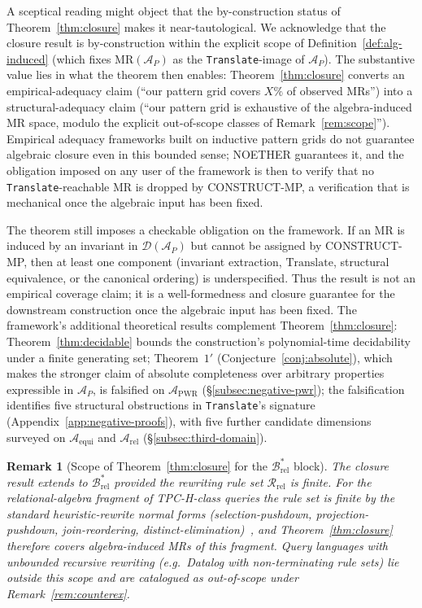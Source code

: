 \documentclass[acmsmall, screen]{acmart}
\newtheorem{remark}{Remark}
\begin{document}
A sceptical reading might object that the by-construction status of Theorem~\ref{thm:closure} makes it near-tautological. We acknowledge that the closure result is by-construction within the explicit scope of Definition~\ref{def:alg-induced} (which fixes $\mathrm{MR}(\mathcal{A}_P)$ as the \texttt{Translate}-image of $\mathcal{A}_P$). The substantive value lies in what the theorem then enables: Theorem~\ref{thm:closure} converts an empirical-adequacy claim (``our pattern grid covers $X\%$ of observed MRs'') into a structural-adequacy claim (``our pattern grid is exhaustive of the algebra-induced MR space, modulo the explicit out-of-scope classes of Remark~\ref{rem:scope}''). Empirical adequacy frameworks built on inductive pattern grids do not guarantee algebraic closure even in this bounded sense; NOETHER guarantees it, and the obligation imposed on any user of the framework is then to verify that no \texttt{Translate}-reachable MR is dropped by CONSTRUCT-MP, a verification that is mechanical once the algebraic input has been fixed.

The theorem still imposes a checkable obligation on the framework. If an MR is induced by an invariant in $\mathcal{D}(\mathcal{A}_P)$ but cannot be assigned by CONSTRUCT-MP, then at least one component (invariant extraction, $\mathrm{Translate}$, structural equivalence, or the canonical ordering) is underspecified. Thus the result is not an empirical coverage claim; it is a well-formedness and closure guarantee for the downstream construction once the algebraic input has been fixed. The framework's additional theoretical results complement Theorem~\ref{thm:closure}: Theorem~\ref{thm:decidable} bounds the construction's polynomial-time decidability under a finite generating set; Theorem~$1'$ (Conjecture~\ref{conj:absolute}), which makes the stronger claim of absolute completeness over arbitrary properties expressible in $\mathcal{A}_P$, is falsified on $\mathcal{A}_{\mathrm{PWR}}$ (\S\ref{subsec:negative-pwr}); the falsification identifies five structural obstructions in \texttt{Translate}'s signature (Appendix~\ref{app:negative-proofs}), with five further candidate dimensions surveyed on $\mathcal{A}_{\mathrm{equi}}$ and $\mathcal{A}_{\mathrm{rel}}$ (\S\ref{subsec:third-domain}).

\begin{remark}[Scope of Theorem~\ref{thm:closure} for the $\mathcal{B}^{*}_{\mathrm{rel}}$ block]
\label{rem:closure-brel}
The closure result extends to $\mathcal{B}^{*}_{\mathrm{rel}}$ provided the rewriting rule set $\mathcal{R}_{\mathrm{rel}}$ is finite. For the relational-algebra fragment of TPC-H-class queries the rule set is finite by the standard heuristic-rewrite normal forms (selection-pushdown, projection-pushdown, join-reordering, distinct-elimination)~\cite{Wang2024QED, Zhou2022SPES}, and Theorem~\ref{thm:closure} therefore covers algebra-induced MRs of this fragment. Query languages with unbounded recursive rewriting (e.g.\ Datalog with non-terminating rule sets) lie outside this scope and are catalogued as out-of-scope under Remark~\ref{rem:counterex}.
\end{remark}
\end{document}
